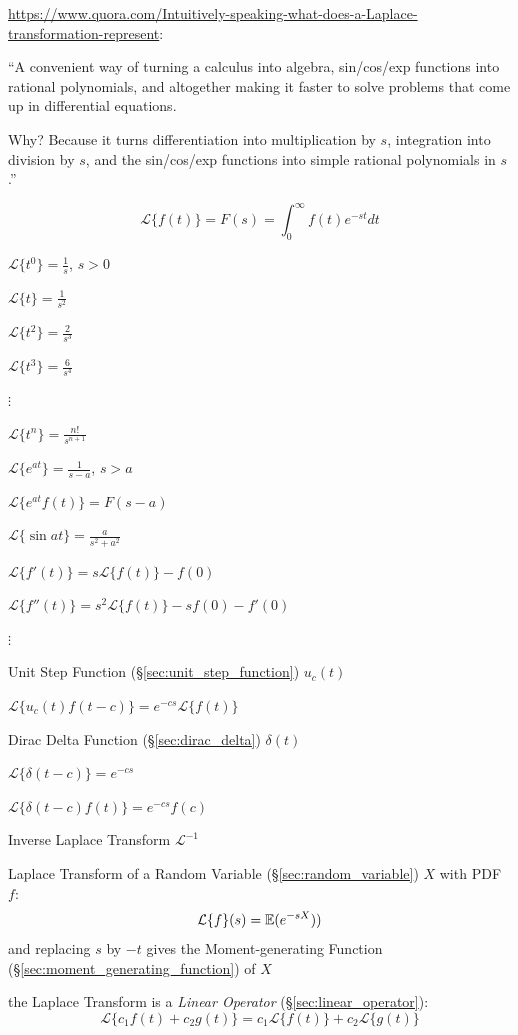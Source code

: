 {\url{https://www.quora.com/Intuitively-speaking-what-does-a-Laplace-transformation-represent}:

``A convenient way of turning a calculus into algebra, sin/cos/exp functions
into rational polynomials, and altogether making it faster to solve problems
that come up in differential equations.

Why? Because it turns differentiation into multiplication by $s$, integration
into division by $s$, and the sin/cos/exp functions into simple rational
polynomials in $s$.''

\[
  \mathcal{L} \{ f(t) \} = F(s) = \int_0^\infty f(t) e^{-st} dt
\]

$\mathcal{L}\{t^0\} = \frac{1}{s}$, $s > 0$

$\mathcal{L}\{t\} = \frac{1}{s^2}$

$\mathcal{L}\{t^2\} = \frac{2}{s^3}$

$\mathcal{L}\{t^3\} = \frac{6}{s^4}$

$\vdots$

$\mathcal{L}\{t^n\} = \frac{n!}{s^{n+1}}$

$\mathcal{L}\{e^{at}\} = \frac{1}{s-a}$, $s > a$

$\mathcal{L}\{e^{at}f(t)\} = F(s-a)$

$\mathcal{L}\{\sin at\} = \frac{a}{s^2+a^2}$

$\mathcal{L}\{ f'(t) \} = s \mathcal{L} \{f(t)\} - f(0)$

$\mathcal{L}\{ f''(t) \} = s^2 \mathcal{L} \{f(t)\} - sf(0) - f'(0)$

$\vdots$

Unit Step Function (\S\ref{sec:unit_step_function}) $u_c(t)$

$\mathcal{L}\{ u_c(t)f(t-c) \} = e^{-cs}\mathcal{L}\{f(t)\}$

Dirac Delta Function (\S\ref{sec:dirac_delta}) $\delta(t)$

$\mathcal{L}\{ \delta(t-c) \} = e^{-cs}$

$\mathcal{L}\{ \delta(t-c)f(t) \} = e^{-cs}f(c) $

Inverse Laplace Transform $\mathcal{L}^{-1}$

Laplace Transform of a Random Variable (\S\ref{sec:random_variable}) $X$ with
PDF $f$:
\[
  \mathcal{L}\{f\}(s) = \mathbb{E}(e^{-sX}))
\]
and replacing $s$ by $-t$ gives the Moment-generating Function
(\S\ref{sec:moment_generating_function}) of $X$

the Laplace Transform is a \emph{Linear Operator}
(\S\ref{sec:linear_operator}):
\[
  \mathcal{L} \{ c_1 f(t) + c_2 g(t) \}
    = c_1\mathcal{L}\{f(t)\} + c_2\mathcal{L}\{g(t)\}
\]

}
